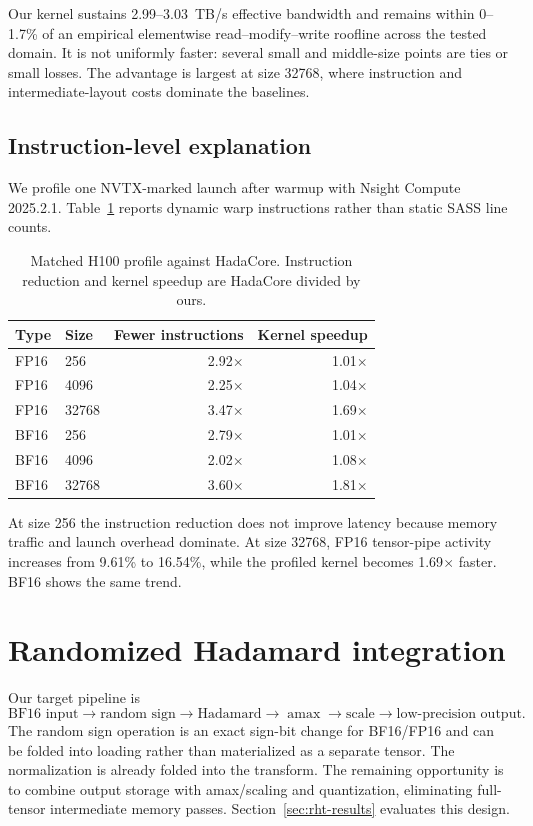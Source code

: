 \documentclass{article}
\begin{document}
Our kernel sustains 2.99--3.03~TB/s effective bandwidth and remains within
0--1.7\% of an empirical elementwise read--modify--write roofline across the
tested domain. It is not uniformly faster: several small and middle-size
points are ties or small losses. The advantage is largest at size 32768, where
instruction and intermediate-layout costs dominate the baselines.

\subsection{Instruction-level explanation}
\label{sec:profile}
We profile one NVTX-marked launch after warmup with Nsight Compute 2025.2.1.
Table~\ref{tab:profile} reports dynamic warp instructions rather than static
SASS line counts.

\begin{table}[t]
\caption{Matched H100 profile against HadaCore. Instruction reduction and
kernel speedup are HadaCore divided by ours.}
\label{tab:profile}
\centering
\small
\begin{tabular}{llrr}
\toprule
Type & Size & Fewer instructions & Kernel speedup \\
\midrule
FP16 & 256   & 2.92$\times$ & 1.01$\times$ \\
FP16 & 4096  & 2.25$\times$ & 1.04$\times$ \\
FP16 & 32768 & 3.47$\times$ & 1.69$\times$ \\
BF16 & 256   & 2.79$\times$ & 1.01$\times$ \\
BF16 & 4096  & 2.02$\times$ & 1.08$\times$ \\
BF16 & 32768 & 3.60$\times$ & 1.81$\times$ \\
\bottomrule
\end{tabular}
\end{table}

At size 256 the instruction reduction does not improve latency because memory
traffic and launch overhead dominate. At size 32768, FP16 tensor-pipe activity
increases from 9.61\% to 16.54\%, while the profiled kernel becomes
1.69$\times$ faster. BF16 shows the same trend.

\section{Randomized Hadamard integration}
\label{sec:rht}
Our target pipeline is
\begin{equation}
\text{BF16 input}\rightarrow\text{random sign}\rightarrow
\text{Hadamard}\rightarrow\operatorname{amax}\rightarrow
\text{scale}\rightarrow\text{low-precision output}.
\end{equation}
The random sign operation is an exact sign-bit change for BF16/FP16 and can be
folded into loading rather than materialized as a separate tensor. The
normalization is already folded into the transform. The remaining opportunity
is to combine output storage with amax/scaling and quantization, eliminating
full-tensor intermediate memory passes. Section~\ref{sec:rht-results} evaluates
this design.
\end{document}
